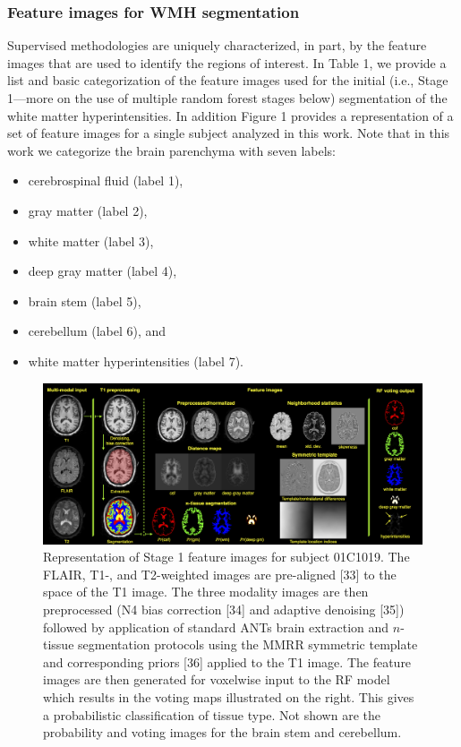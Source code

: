 \documentclass[11pt,]{article}
\providecommand{\tightlist}{%
  \setlength{\itemsep}{0pt}\setlength{\parskip}{0pt}}
\begin{document}
\subsubsection{Feature images for WMH
segmentation}\label{feature-images-for-wmh-segmentation}



Supervised methodologies are uniquely characterized, in part, by the
feature images that are used to identify the regions of interest. In
Table 1, we provide a list and basic categorization of the feature
images used for the initial (i.e., Stage 1---more on the use of multiple
random forest stages below) segmentation of the white matter
hyperintensities. In addition Figure 1 provides a representation of a
set of feature images for a single subject analyzed in this work. Note
that in this work we categorize the brain parenchyma with seven labels:

\begin{itemize}
\tightlist
\item
  cerebrospinal fluid (label 1),
\item
  gray matter (label 2),
\item
  white matter (label 3),
\item
  deep gray matter (label 4),
\item
  brain stem (label 5),
\item
  cerebellum (label 6), and
\item
  white matter hyperintensities (label 7).
\end{itemize}

\begin{figure}[htbp]
\centering
\includegraphics{Figures/featureImages.png}
\caption{Representation of Stage 1 feature images for subject 01C1019.
The FLAIR, T1-, and T2-weighted images are
 pre-aligned {[}33{]} to the space
of the T1 image. The three modality images are then preprocessed (N4
bias correction {[}34{]} and adaptive denoising {[}35{]}) followed by
application of standard ANTs brain extraction and \(n\)-tissue
segmentation protocols using the MMRR symmetric template and
corresponding priors {[}36{]} applied to the T1 image. The feature
images are then generated for voxelwise input to the RF model which
results in the voting maps illustrated on the right. This gives a
probabilistic classification of tissue type. Not shown are the
probability and voting images for the brain stem and cerebellum.}
\end{figure}
\end{document}
